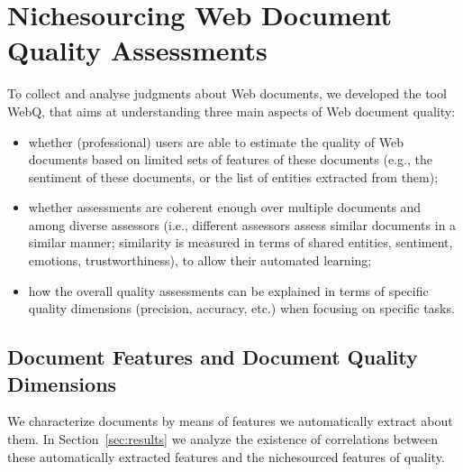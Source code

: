 \documentclass{llncs}
\begin{document}
\section{Nichesourcing Web Document Quality Assessments}
\label{sec:webq}
To collect and analyse judgments about Web documents, we developed the tool WebQ, that aims at understanding three main aspects of Web document quality:
\begin{itemize}
\item  whether (professional) users are able to estimate the quality of Web documents based on limited sets of features of these documents (e.g., the sentiment of these documents, or the list of entities extracted from them);
\item  whether assessments are coherent enough over multiple documents and among diverse assessors (i.e., different assessors assess similar documents in a similar manner; similarity is measured in terms of shared entities, sentiment, emotions, trustworthiness), to allow their automated learning;
%
%
%
%
%
\item  how the overall quality assessments can be explained in terms of specific quality dimensions (precision, accuracy, etc.) when focusing on specific tasks.
%
%
%
%
%
\end{itemize}

\subsection{Document Features and Document Quality Dimensions}
We characterize documents by means of features we automatically extract about them. In Section~\ref{sec:results} we analyze the existence of correlations between these automatically extracted features and the nichesourced features of quality.
\end{document}
